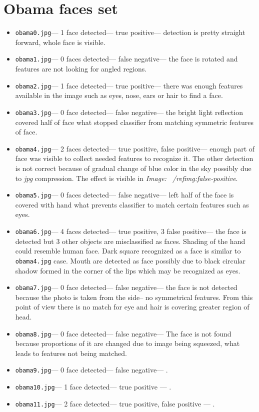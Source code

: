 \documentclass[12pt,a4paper,twocolumn]{article}
\begin{document}
\section*{Obama faces set}
\begin{itemize}
\item \texttt{obama0.jpg}--- 1 face detected--- true positive--- detection is pretty straight forward, whole face is visible.
\item \texttt{obama1.jpg}--- 0 faces detected--- false negative--- the face is rotated and features are not looking for angled regions.
\item \texttt{obama2.jpg}--- 1 face detected--- true positive--- there was enough features available in the image such as eyes, nose, ears or hair to find a face.
\item \texttt{obama3.jpg}--- 0 face detected--- false negative--- the bright light reflection covered half of face what stopped classifier from matching symmetric features of face.
\item \texttt{obama4.jpg}--- 2 faces detected--- true positive, false positive--- enough part of face was visible to collect needed features to recognize it. The other detection is not correct because of gradual change of blue color in the sky possibly due to \textit{jpg} compression. The effect is visible in \textit{Image: ~/ref{img:false-positive}}.
\item \texttt{obama5.jpg}--- 0 faces detected--- false negative--- left half of the face is covered with hand what prevents classifier to match certain features such as eyes.
\item \texttt{obama6.jpg}--- 4 faces detected--- true positive, 3 false positive--- the face is detected but 3 other objects are misclassified as faces. Shading of the hand could resemble human face. Dark square recognized as a face is similar to \texttt{obama4.jpg} case. Mouth are detected as face possibly due to black circular shadow formed in the corner of the lips which may be recognized as eyes.
\item \texttt{obama7.jpg}--- 0 face detected--- false negative--- the face is not detected because the photo is taken from the side-- no symmetrical features. From this point of view there is no match for eye and hair is covering greater region of head.
\item \texttt{obama8.jpg}--- 0 face detected--- false negative--- The face is not found because proportions of it are changed due to image being squeezed, what leads to features not being matched.
\item \texttt{obama9.jpg}--- 0 face detected--- false negative--- .
\item \texttt{obama10.jpg}--- 1 face detected--- true positive --- .
\item \texttt{obama11.jpg}--- 2 face detected--- true positive, false positive --- .
\end{itemize}
\end{document}
